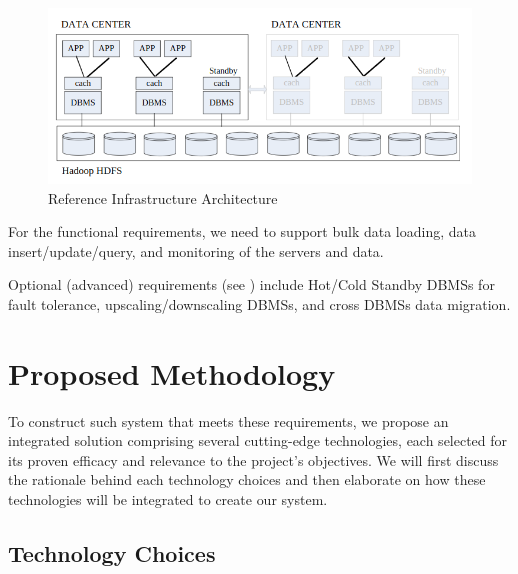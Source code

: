 \documentclass{report}
\begin{document}
    \begin{figure}[h]
        \centering
        \includegraphics[width=\textwidth]{images/reference-architecture}
        \caption{Reference Infrastructure Architecture}
        \label{fig:reference-infrastructure-architecture}
    \end{figure}

    For the functional requirements, we need to support bulk data loading, data insert/update/query, and monitoring of the servers and data.

    Optional (advanced) requirements (see ) include Hot/Cold Standby DBMSs for fault tolerance, upscaling/downscaling DBMSs, and cross DBMSs data migration.

    \section{Proposed Methodology}
    To construct such system that meets these requirements, we propose an integrated solution comprising several cutting-edge technologies, each selected for its proven efficacy and relevance to the project's objectives. We will first discuss the rationale behind each technology choices and then elaborate on how these technologies will be integrated to create our system.

    \subsection{Technology Choices}
\end{document}
